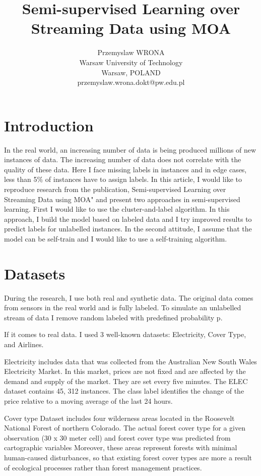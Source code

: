\documentclass[twocolumn]{article}
\title{Semi-supervised Learning over Streaming Data using MOA}
\author{Przemyslaw WRONA \\ Warsaw University of Technology \\ Warsaw, POLAND \\ przemyslaw.wrona.dokt@pw.edu.pl}
\begin{document}
    \maketitle

    \section*{Introduction}

    In the real world, an increasing number of data is being produced millions of new instances of data. The increasing number of data does not correlate with the quality of these data.
    Here I face missing labels in instances and in edge cases, less than 5{\%} of instances have to assign labels.
    In this article, I would like to reproduce research from the publication, Semi-supervised Learning over Streaming Data using MOA" and present two approaches in semi-supervised learning.
    First I would like to use the cluster-and-label algorithm.
    In this approach, I build the model based on labeled data and I try improved results to predict labels for unlabelled instances.
    In the second attitude, I assume that the model can be self-train and I would like to use a self-training algorithm.

    \section*{Datasets}

    During the research, I use both real and synthetic data.
    The original data comes from sensors in the real world and is fully labeled.
    To simulate an unlabelled stream of data I remove random labeled with predefined probability p.

    If it comes to real data.
    I used 3 well-known datasets: Electricity, Cover Type, and Airlines.

    Electricity includes data that was collected from the Australian New South Wales Electricity Market.
    In this market, prices are not fixed and are affected by the demand and supply of the market.
    They are set every five minutes.
    The ELEC dataset contains 45, 312 instances.
    The class label identifies the change of the price relative to a moving average of the last 24 hours.

    Cover type Dataset includes four wilderness areas located in the Roosevelt National Forest of northern Colorado.
    The actual forest cover type for a given observation (30 x 30 meter cell) and forest cover type was predicted from cartographic variables
    Moreover, these areas represent forests with minimal human-caused disturbances, so that existing forest cover types are more a result of ecological processes rather than forest management practices.
\end{document}
